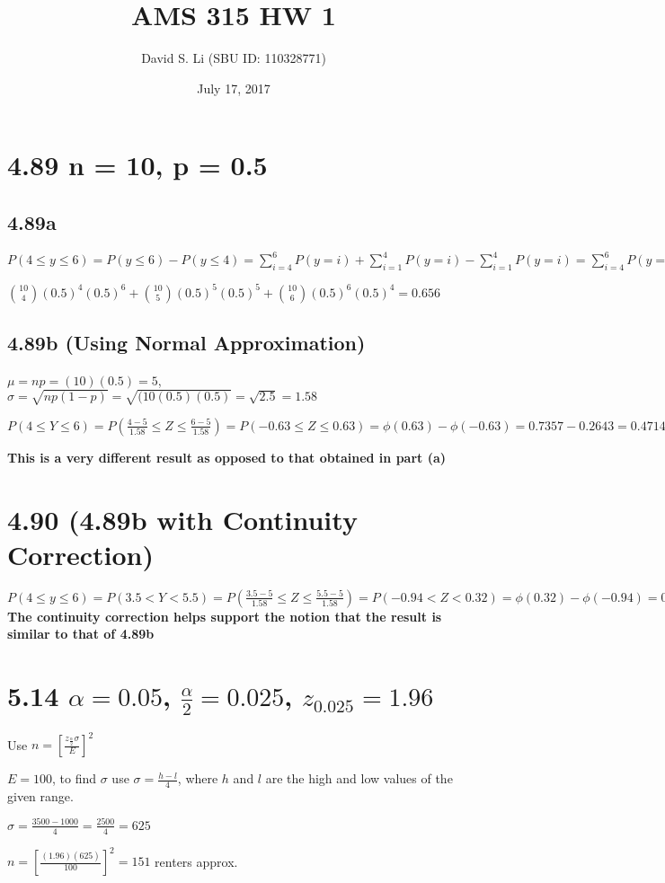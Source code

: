 \documentclass[16pt]{article}
\title{AMS 315 HW 1}
\author{David S. Li (SBU ID: 110328771)}
\date{July 17, 2017}
\begin{document}
\maketitle

\section*{4.89 n = 10, p = 0.5}

\subsection*{4.89a}
$P(4 \leq y \leq 6) = P(y \leq 6) - P(y \leq 4) = \sum^{6}_{i = 4}P(y = i) + \sum^{4}_{i = 1}P(y = i) - \sum^{4}_{i = 1}P(y = i) = \sum^{6}_{i = 4}P(y = i) =$ \par\vspace{0.25cm}\noindent
${{10}\choose{4}}(0.5)^{4}(0.5)^{6} + {{10}\choose{5}}(0.5)^{5}(0.5)^{5} + {{10}\choose{6}}(0.5)^{6}(0.5)^{4} = 0.656$

\subsection*{4.89b (Using Normal Approximation)}
$\mu = np = (10)(0.5) = 5$, $\sigma = \sqrt{np(1 - p)} = \sqrt{(10(0.5)(0.5)} = \sqrt{2.5} = 1.58$ \par\vspace{0.25cm}

\noindent $P(4 \leq Y \leq 6) = P(\frac{4 - 5}{1.58} \leq Z \leq \frac{6 - 5}{1.58}) = P(-0.63 \leq Z \leq 0.63) = \phi(0.63) - \phi(-0.63) = 0.7357 - 0.2643 = 0.4714$ \par\noindent
\textbf{This is a very different result as opposed to that obtained in part (a)}

\section*{4.90 (4.89b with Continuity Correction)}
$P(4 \leq y \leq 6) = P(3.5 < Y < 5.5) = P(\frac{3.5 - 5}{1.58} \leq Z \leq \frac{5.5 - 5}{1.58}) = P(-0.94 < Z < 0.32) = \phi(0.32) - \phi(-0.94) = 0.6255 - 0.1736 = 0.452 \rightarrow$
\textbf{The continuity correction helps support the notion that the result is similar to that of 4.89b}

\section*{5.14 $\alpha = 0.05$, $\frac{\alpha}{2} = 0.025$, $z_{0.025} = 1.96$}
Use $n = [\frac{z_{\frac{\alpha}{2}}\sigma}{E}]^{2}$ \par\vspace{0.25cm}
\noindent $E = 100$, to find $\sigma$ use $\sigma = \frac{h - l}{4}$, where $h$ and $l$ are the high and low values of the given range. \par
\noindent $\sigma = \frac{3500 - 1000}{4} = \frac{2500}{4} = 625$ \par
\noindent $n = [\frac{(1.96)(625)}{100}]^{2} = 151$ renters approx.
\end{document}
